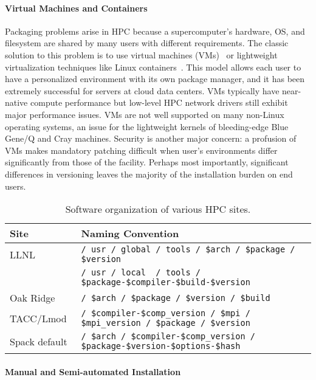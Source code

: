 \paragraph{Virtual Machines and Containers}

Packaging problems arise in HPC because a supercomputer's hardware, OS, and
filesystem are shared by many users with different requirements.  The classic
solution to this problem is to use virtual
machines (VMs)~\cite{barham2003xen,rosenblum1999vmware,smith2005architecture}
or lightweight virtualization techniques like Linux
containers~\cite{felter2014updated,merkel2014docker}. This model allows each
 user to have a personalized environment with its own package manager, and it
has been extremely successful for servers at cloud data centers. VMs typically
have near-native compute performance but low-level HPC network drivers still
exhibit major performance issues. VMs are not well supported on many
non-Linux operating systems, an issue for the lightweight
kernels of bleeding-edge Blue Gene/Q and Cray machines. Security
is another major concern: a profusion of VMs makes mandatory patching
difficult when user's environments differ significantly from those of
the facility. Perhaps most importantly, significant differences in
versioning leaves the majority of the installation burden on end users.

\begin{table*}\centering
\begin{tabular}{|l|l|}
\hline
Site           & Naming Convention \\
\hline
\hline
LLNL       & {\tt / usr / global / tools / \$arch / \$package / \$version} \\
           & {\tt / usr / local~ / tools / \$package-\$compiler-\$build-\$version } \\
\hline
Oak Ridge~\cite{jones+:cug08}  & {\tt / \$arch / \$package / \$version / \$build} \\
\hline
TACC/Lmod~\cite{mclay:lmod-tutorial}& {\tt / \$compiler-\$comp\_version / \$mpi / \$mpi\_version / \$package / \$version} \\
\hline
\hline
Spack default                  & {\tt / \$arch / \$compiler-\$comp\_version / \$package-\$version-\$options-\$hash} \\
\hline
\end{tabular}
\caption{
	Software organization of various HPC sites.
	\label{tab:naming-conventions}
}
\end{table*}

\paragraph{Manual and Semi-automated Installation}

